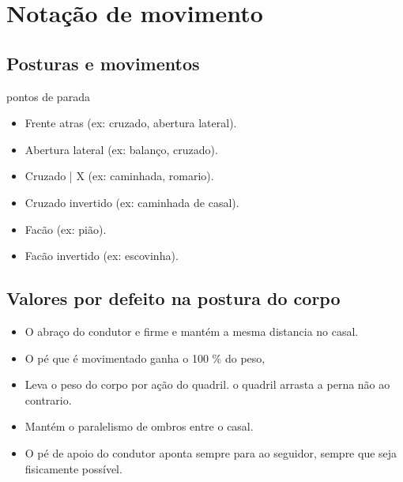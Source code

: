 

\chapter{Notação de movimento}


\section{Posturas e movimentos}

pontos de parada
\begin{itemize}
\item Frente atras (ex: cruzado, abertura lateral).
\item Abertura lateral (ex: balanço, cruzado).
\item Cruzado | X (ex: caminhada, romario).
\item Cruzado invertido (ex: caminhada de casal).
\item Facão (ex: pião).
\item Facão invertido (ex: escovinha).
\end{itemize}


\section{Valores por defeito na postura do corpo}


\begin{itemize}
\item O abraço do condutor e firme e mantém a mesma distancia no casal.
\item O pé que é movimentado ganha o 100 $\%$ do peso,
\item Leva o peso do corpo por ação do quadril. o quadril arrasta a perna não ao contrario.
\item Mantém o paralelismo de ombros entre o casal.
\item O pé de apoio do condutor aponta sempre para ao seguidor, sempre que seja fisicamente possível.
\end{itemize}


